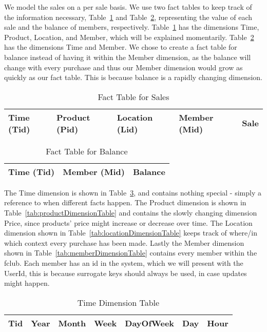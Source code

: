 We model the sales on a per sale basis. We use two fact tables to keep track of the information necessary, Table~\ref{tab:salesFactTable} and Table~\ref{tab:balanceFactTable}, representing the value of each sale and the balance of members, respectively. Table~\ref{tab:salesFactTable} has the dimensions Time, Product, Location, and Member, which will be explained momentarily. Table~\ref{tab:balanceFactTable} has the dimensions Time and Member. We chose to create a fact table for balance instead of having it within the Member dimension, as the balance will change with every purchase and thus our Member dimension would grow as quickly as our fact table. This is because balance is a rapidly changing dimension.


\begin{table}[H]
    \centering
    \begin{tabular}{|l|l|l|l|l|}
        \hline
        Time (Tid) & Product (Pid) & Location (Lid) & Member (Mid) & Sale \\ \hline
    \end{tabular}
    \caption{Fact Table for Sales}
    \label{tab:salesFactTable}
\end{table}

\begin{table}[H]
    \centering
    \begin{tabular}{|l|l|l|}
        \hline
        Time (Tid) & Member (Mid) & Balance \\ \hline
    \end{tabular}
    \caption{Fact Table for Balance}
    \label{tab:balanceFactTable}
\end{table}

The Time dimension is shown in Table~\ref{tab:timeDimensionTable}, and contains nothing special - simply a reference to when different facts happen. The Product dimension is shown in Table~\ref{tab:productDimensionTable} and contains the slowly changing dimension Price, since products' price might increase or decrease over time. The Location dimension shown in Table~\ref{tab:locationDimensionTable} keeps track of where/in which context every purchase has been made. Lastly the Member dimension shown in Table~\ref{tab:memberDimensionTable} contains every member within the fclub. Each member has an id in the system, which we will present with the UserId, this is because surrogate keys should always be used, in case updates might happen.

\begin{table}[H]
    \centering
    \begin{tabular}{|l|l|l|l|l|l|l|}
        \hline
        Tid & Year & Month & Week & DayOfWeek & Day & Hour \\ \hline
    \end{tabular}
    \caption{Time Dimension Table}
    \label{tab:timeDimensionTable}
\end{table}

